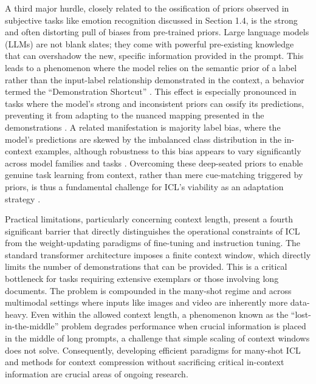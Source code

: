 \documentclass[11pt]{article}
\begin{document}
A third major hurdle, closely related to the ossification of priors observed in subjective tasks like emotion recognition discussed in Section 1.4, is the strong and often distorting pull of biases from pre-trained priors. Large language models (LLMs) are not blank slates; they come with powerful pre-existing knowledge that can overshadow the new, specific information provided in the prompt. This leads to a phenomenon where the model relies on the semantic prior of a label rather than the input-label relationship demonstrated in the context, a behavior termed the ``Demonstration Shortcut'' \cite{ref23}. This effect is especially pronounced in tasks where the model's strong and inconsistent priors can ossify its predictions, preventing it from adapting to the nuanced mapping presented in the demonstrations \cite{ref29}. A related manifestation is majority label bias, where the model's predictions are skewed by the imbalanced class distribution in the in-context examples, although robustness to this bias appears to vary significantly across model families and tasks \cite{ref40}. Overcoming these deep-seated priors to enable genuine task learning from context, rather than mere cue-matching triggered by priors, is thus a fundamental challenge for ICL's viability as an adaptation strategy \cite{ref7}.

Practical limitations, particularly concerning context length, present a fourth significant barrier that directly distinguishes the operational constraints of ICL from the weight-updating paradigms of fine-tuning and instruction tuning. The standard transformer architecture imposes a finite context window, which directly limits the number of demonstrations that can be provided. This is a critical bottleneck for tasks requiring extensive exemplars or those involving long documents. The problem is compounded in the many-shot regime and across multimodal settings where inputs like images and video are inherently more data-heavy. Even within the allowed context length, a phenomenon known as the ``lost-in-the-middle'' problem degrades performance when crucial information is placed in the middle of long prompts, a challenge that simple scaling of context windows does not solve. Consequently, developing efficient paradigms for many-shot ICL and methods for context compression without sacrificing critical in-context information are crucial areas of ongoing research.
\end{document}
